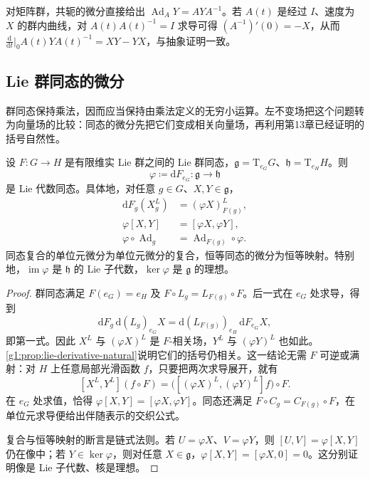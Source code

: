 对矩阵群，共轭的微分直接给出 \(\operatorname{Ad}_AY=AYA^{-1}\)。若 \(A(t)\) 是经过 \(I\)、速度为 \(X\) 的群内曲线，对 \(A(t)A(t)^{-1}=I\) 求导可得 \((A^{-1})'(0)=-X\)，从而 \(\frac{\mathrm{d}}{\mathrm{d}t}|_0 A(t)YA(t)^{-1}=XY-YX\)，与抽象证明一致。

\subsection{Lie 群同态的微分}
\label{g1:subsec:1601:04}

群同态保持乘法，因而应当保持由乘法定义的无穷小运算。左不变场把这个问题转为向量场的比较：同态的微分先把它们变成相关向量场，再利用第13章已经证明的括号自然性。

\begin{proposition}\label{g1:prop:lie-homomorphism-differential}
	设 \(F:G\to H\) 是有限维实 Lie 群之间的 Lie 群同态，\(\mathfrak g=\mathrm{T}_{e_G}G\)、\(\mathfrak h=\mathrm{T}_{e_H}H\)。则
	\[
		\varphi\coloneqq\mathrm{d}F_{e_G}:\mathfrak g\longrightarrow\mathfrak h
	\]
	是 Lie 代数同态。具体地，对任意 \(g\in G\)、\(X,Y\in\mathfrak g\)，
	\begin{align*}
		\mathrm{d}F_g(X^L_g)&=(\varphi X)^L_{F(g)},\\
		\varphi[X,Y]&=[\varphi X,\varphi Y],\\
		\varphi\circ\operatorname{Ad}_g&=\operatorname{Ad}_{F(g)}\circ\varphi.
	\end{align*}
	同态复合的单位元微分为单位元微分的复合，恒等同态的微分为恒等映射。特别地，\(\operatorname{im}\varphi\) 是 \(\mathfrak h\) 的 Lie 子代数，\(\ker\varphi\) 是 \(\mathfrak g\) 的理想。
\end{proposition}
\begin{proof}
	群同态满足 \(F(e_G)=e_H\) 及 \(F\circ L_g=L_{F(g)}\circ F\)。后一式在 \(e_G\) 处求导，得到
	\[
		\mathrm{d}F_g\,\mathrm{d}(L_g)_{e_G}X
		=\mathrm{d}(L_{F(g)})_{e_H}\,\mathrm{d}F_{e_G}X,
	\]
	即第一式。因此 \(X^L\) 与 \((\varphi X)^L\) 是 \(F\)-相关场，\(Y^L\) 与 \((\varphi Y)^L\) 也如此。\cref{g1:prop:lie-derivative-natural}说明它们的括号仍相关。这一结论无需 \(F\) 可逆或满射：对 \(H\) 上任意局部光滑函数 \(f\)，只要把两次求导展开，就有
	\[
		[X^L,Y^L](f\circ F)
		=\bigl([(\varphi X)^L,(\varphi Y)^L]f\bigr)\circ F.
	\]
	在 \(e_G\) 处求值，恰得 \(\varphi[X,Y]=[\varphi X,\varphi Y]\)。同态还满足 \(F\circ C_g=C_{F(g)}\circ F\)，在单位元求导便给出伴随表示的交织公式。

	复合与恒等映射的断言是链式法则。若 \(U=\varphi X\)、\(V=\varphi Y\)，则 \([U,V]=\varphi[X,Y]\) 仍在像中；若 \(Y\in\ker\varphi\)，则对任意 \(X\in\mathfrak g\)，\(\varphi[X,Y]=[\varphi X,0]=0\)。这分别证明像是 Lie 子代数、核是理想。
\end{proof}

